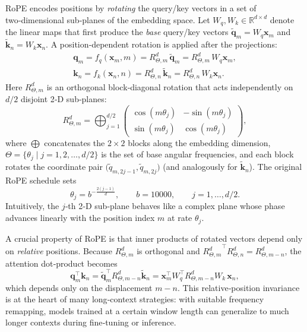 RoPE encodes positions by \emph{rotating} the query/key vectors in a set of
two‑dimensional sub‑planes of the embedding space.
Let $W_q,W_k\in\mathbb R^{d\times d}$ denote the linear maps that first produce the
\emph{base} query/key vectors
$\tilde{\mathbf q}_m=W_q\mathbf x_m$ and $\tilde{\mathbf k}_n=W_k\mathbf x_n$.
A position‑dependent rotation is applied after the projections:
\begin{align}\label{eq:rope-rotate-qk}
\mathbf q_m
    = f_q(\mathbf x_{m},m)
    = R^d_{\Theta,m}\,\tilde{\mathbf q}_m
    = R^d_{\Theta,m}\,W_q\mathbf x_m, 
\\
\mathbf k_n
    = f_k(\mathbf x_{n},n)
    = R^d_{\Theta,n}\,\tilde{\mathbf k}_n
    = R^d_{\Theta,n}\,W_k\mathbf x_n .
\end{align}
Here $R^d_{\Theta,m}$ is an orthogonal block‑diagonal rotation that acts independently
on $d/2$ disjoint 2‑D sub‑planes:
\begin{equation}
\label{eq:R-block}
R^d_{\Theta,m}
=\bigoplus_{j=1}^{d/2}
\begin{pmatrix}
\cos(m\theta_j) & -\sin(m\theta_j)\\
\sin(m\theta_j) &  \cos(m\theta_j)
\end{pmatrix},
\end{equation}
where $\bigoplus$ concatenates the $2{\times}2$ blocks along the embedding dimension,
$\Theta=\{\theta_{j}\mid j=1,2,\dots,d/2\}$ is the set of base angular frequencies, and
each block rotates the coordinate pair
$\bigl(\tilde q_{m,2j-1},\tilde q_{m,2j}\bigr)$ (and analogously for
$\tilde{\mathbf k}_n$).
The original RoPE schedule sets
\[
\theta_j = b^{-\frac{2(j-1)}{d}}, \qquad b=10000, \qquad j=1,\dots,d/2 .
\]
Intuitively, the $j$‑th 2‑D sub‑plane behaves like a complex plane whose phase advances
linearly with the position index $m$ at rate $\theta_j$.

A crucial property of RoPE is that inner products of rotated vectors depend only on
\emph{relative} positions. Because $R^d_{\Theta,m}$ is orthogonal and
${R^d_{\Theta,m}}^{\top} R^d_{\Theta,n}=R^d_{\Theta,{m-n}}$, 
the attention dot‑product becomes
\begin{equation}\label{eq:rope-relative}
\mathbf q_m^{\top}\mathbf k_n
  = \tilde{\mathbf q}_m^{\top} R^d_{\Theta,{m-n}} \tilde{\mathbf k}_n
  = \mathbf x_{m}^{\top} W_q^{\top} R^d_{\Theta,{m-n}} W_k\,\mathbf x_n ,
\end{equation}
which depends only on the displacement $m-n$.
This relative‑position invariance is at the heart of many long‑context strategies:
with suitable frequency remapping, models trained at a certain window length can
generalize to much longer contexts during fine‑tuning or inference.


